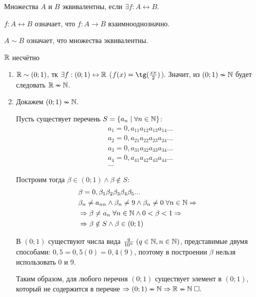 \documentclass{article}
\begin{document}


Множества $A$ и $B$	эквивалентны, если $\exists f:A\leftrightarrow B$.

$f:A\leftrightarrow B$ означает, что $f:A\to B$ взаимнооднозначно.

$A\sim B$ означает, что множества эквивалентны.

\theorem

$\mathbb{R}$ несчётно

\proof
\begin{enumerate}
	\item{}$\mathbb{R}\sim(0;1)$, тк $\exists f:(0;1)\leftrightarrow\mathbb{R}$ ($f(x)=\tg(\frac{x\pi}{2})$). Значит, из $(0;1)\nsim\mathbb{N}$ будет следовать $\mathbb{R}\nsim\mathbb{N}$.
	\item{}Докажем $(0;1)\nsim\mathbb{N}$.

	Пусть существует перечень $S=\{a_n\;|\;\forall n\in\mathbb{N}\}$:
	\begin{align*}
		 & a_1=0,a_{11}a_{12}a_{13}a_{14}... \\
		 & a_2=0,a_{21}a_{22}a_{23}a_{24}... \\
		 & a_3=0,a_{31}a_{32}a_{33}a_{34}... \\
		 & a_4=0,a_{41}a_{42}a_{43}a_{44}... \\
		 & ...
	\end{align*}

	Построим тогда $\beta\in(0;1)\land\beta\notin S$:
	\begin{align*}
		 & \beta=0,\beta_1\beta_2\beta_3\beta_4\beta_5...                               \\
		 & \beta_n\neq a_{nn}\land \beta_n\neq 9\land\beta_n\neq 0\;\forall n\in\mathbb{N}\Rightarrow \\
		 & \Rightarrow \beta\neq a_n\;\forall n\in\mathbb{N}\land 0<\beta<1\Rightarrow                      \\
		 & \Rightarrow \beta\notin S\land \beta\in(0;1)
	\end{align*}

	В $(0;1)$ существуют числа вида $\frac{q}{10^{n}}\;(q\in\mathbb{N},n\in\mathbb{N})$, представимые двумя способами:
	$0,5=0,5(0)=0,4(9)$, поэтому в построении $\beta$ нельзя использовать $0$ и $9$.

	Таким образом, для любого перечня $(0;1)$ существует элемент в $(0;1)$, который не содержится в перечне $\Rightarrow(0;1)\nsim\mathbb{N}\Rightarrow\mathbb{R}\nsim\mathbb{N}\;\square.$

\end{enumerate}
\end{document}

